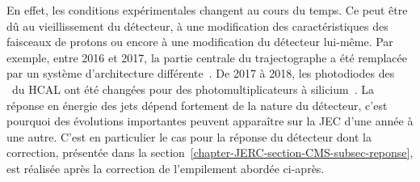 En effet, les conditions expérimentales changent au cours du temps.
Ce peut être dû au vieillissement du détecteur,
à une modification des caractéristiques des faisceaux de protons
ou encore
à une modification du détecteur lui-même.
Par exemple, entre 2016 et 2017, la partie centrale du trajectographe a été remplacée par un système d'architecture différente~\cite{CMS-TDR-11,cms_trk_upgrade_2017}.
De 2017 à 2018, les photodiodes des \CMSendcaps\ du HCAL ont été changées pour des photomultiplicateurs à silicium~\cite{CMS-TDR-10,SiPM_CMS_conf}.
La réponse en énergie des jets dépend fortement de la nature du détecteur, c'est pourquoi des évolutions importantes peuvent apparaître sur la JEC d'une année à une autre.
C'est en particulier le cas pour la réponse du détecteur dont la correction, présentée dans la section~\ref{chapter-JERC-section-CMS-subsec-reponse}, est réalisée après la correction de l'empilement abordée ci-après.

